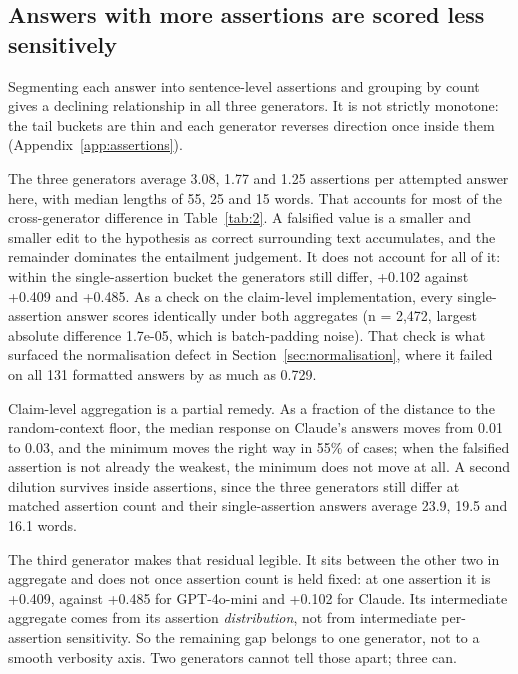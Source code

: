 \documentclass[11pt]{article}
\begin{document}
\subsection{Answers with more assertions are scored less sensitively}
\label{sec:assertions}

Segmenting each answer into sentence-level assertions and grouping by count gives a declining relationship in all three generators. It is not strictly monotone: the tail buckets are thin and each generator reverses direction once inside them (Appendix~\ref{app:assertions}).

The three generators average 3.08, 1.77 and 1.25 assertions per attempted answer here, with median lengths of 55, 25 and 15 words. That accounts for most of the cross-generator difference in Table~\ref{tab:2}. A falsified value is a smaller and smaller edit to the hypothesis as correct surrounding text accumulates, and the remainder dominates the entailment judgement. It does not account for all of it: within the single-assertion bucket the generators still differ, +0.102 against +0.409 and +0.485. As a check on the claim-level implementation, every single-assertion answer scores identically under both aggregates (n = 2,472, largest absolute difference 1.7e-05, which is batch-padding noise). That check is what surfaced the normalisation defect in Section~\ref{sec:normalisation}, where it failed on all 131 formatted answers by as much as 0.729.

Claim-level aggregation is a partial remedy. As a fraction of the distance to the random-context floor, the median response on Claude's answers moves from 0.01 to 0.03, and the minimum moves the right way in 55\% of cases; when the falsified assertion is not already the weakest, the minimum does not move at all. A second dilution survives inside assertions, since the three generators still differ at matched assertion count and their single-assertion answers average 23.9, 19.5 and 16.1 words.

The third generator makes that residual legible. It sits between the other two in aggregate and does not once assertion count is held fixed: at one assertion it is +0.409, against +0.485 for GPT-4o-mini and +0.102 for Claude. Its intermediate aggregate comes from its assertion \emph{distribution}, not from intermediate per-assertion sensitivity. So the remaining gap belongs to one generator, not to a smooth verbosity axis. Two generators cannot tell those apart; three can.
\end{document}
